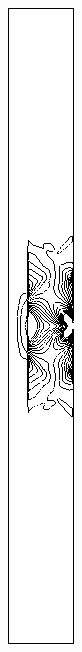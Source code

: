 \begin{figure}[h]
\begin{subfigure}[b]{0.13\textwidth}
\caption{ }
\end{subfigure}
\begin{subfigure}[b]{0.13\textwidth}
\centering
\includegraphics[width=\textwidth]{png/cranium/2d-syy-single-comp-01.png}

\end{subfigure}
\end{figure}
